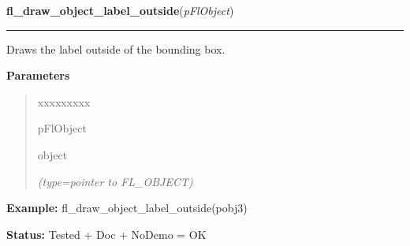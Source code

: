\hspace{.8\funcindent}\begin{boxedminipage}{\funcwidth}

    \raggedright \textbf{fl\_draw\_object\_label\_outside}(\textit{pFlObject})

    \vspace{-1.5ex}

    \rule{\textwidth}{0.5\fboxrule}
\setlength{\parskip}{2ex}
    Draws the label outside of the bounding box.

\setlength{\parskip}{1ex}
      \textbf{Parameters}
      \vspace{-1ex}

      \begin{quote}
        \begin{Ventry}{xxxxxxxxx}

          \item[pFlObject]

          object

            {\it (type=pointer to FL\_OBJECT)}

        \end{Ventry}

      \end{quote}

\textbf{Example:} fl\_draw\_object\_label\_outside(pobj3)



\textbf{Status:} Tested + Doc + NoDemo = OK



    \end{boxedminipage}

    \label{xformslib:flbasic:fl_draw_object_label_outside}

    \vspace{0.5ex}

